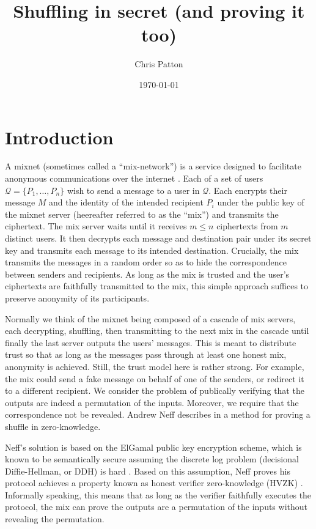 \documentclass[letter]{article}
\date{\today}
\title{Shuffling in secret (and proving it too)}
\author{Chris Patton}
\renewcommand{\cal}[1]{\mathcal{#1}}
\begin{document}
  \maketitle

\section{Introduction}

A mixnet (sometimes called a ``mix-network'') is a service designed to
facilitate anonymous communications over the internet \cite{chaum81}. Each of a
set of users $\cal{Q} = \{P_1, \dots, P_n\}$ wish to send a message to a user in
$\cal{Q}$. Each encrypts their message $M$ and the identity of the intended
recipient $P_i$ under the public key of the mixnet server (heereafter referred
to as the ``mix'') and transmits the ciphertext.  The mix server waits until it
receives $m \le n$ ciphertexts from $m$ distinct users.  It then decrypts each
message and destination pair under its secret key and transmits each message to
its intended destination. Crucially, the mix transmits the messages in a random
order so as to hide the correspondence between senders and recipients.  As long
as the mix is trusted and the user's ciphertexts are faithfully transmitted to
the mix, this simple approach suffices to preserve anonymity of its
participants.

Normally we think of the mixnet being composed of a cascade of mix servers, each
decrypting, shuffling, then transmitting to the next mix in the cascade until
finally the last server outputs the users' messages. This is meant to distribute
trust so that as long as the messages pass through at least one honest mix,
anonymity is achieved. Still, the trust model here is rather strong. For
example, the mix could send a fake message on behalf of one of the senders, or
redirect it to a different recipient.  We consider the problem of publically
verifying that the outputs are indeed a permutation of the inputs. Moreover, we
require that the correspondence not be revealed. Andrew Neff describes in
\cite{neff01} a method for proving a shuffle in zero-knowledge.

Neff's solution is based on the ElGamal public key encryption scheme, which is
known to be semantically secure assuming the discrete log problem (decisional
Diffie-Hellman, or DDH) is hard \cite{elgamal84}. Based on this assumption, Neff
proves his protocol achieves a property known as honest verifier zero-knowledge
(HVZK) \cite{goldreich}. Informally speaking, this means that as long as the verifier
faithfully executes the protocol, the mix can prove the outputs are a
permutation of the inputs without revealing the permutation.
\end{document}
